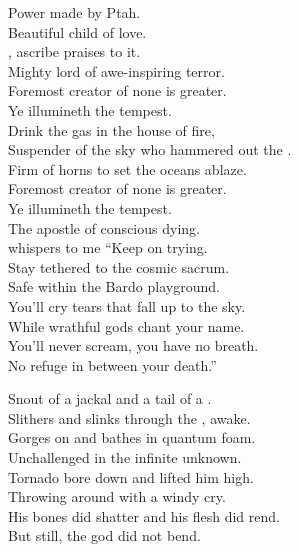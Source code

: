 
Power made by Ptah. \\
Beautiful child of love. \\
, ascribe praises to it. \\
Mighty lord of awe-inspiring terror. \\
Foremost creator of none is greater. \\
Ye illumineth the tempest. \\

Drink the gas in the house of fire, \\
Suspender of the sky who hammered out the . \\
Firm of horns to set the oceans ablaze. \\
Foremost creator of none is greater. \\
Ye illumineth the tempest. \\

The apostle of conscious dying. \\
whispers to me ``Keep on trying. \\
Stay tethered to the cosmic sacrum. \\
Safe within the Bardo playground. \\
You'll cry tears that fall up to the sky. \\
While wrathful gods chant your name. \\
You'll never scream, you have no breath. \\
No refuge in between your death.'' \\




Snout of a jackal and a tail of a . \\
Slithers and slinks through the , awake. \\
Gorges on  and bathes in quantum foam. \\
Unchallenged in the infinite unknown. \\

Tornado bore down and lifted him high. \\
Throwing  around with a windy cry. \\
His bones did shatter and his flesh did rend. \\
But still, the god did not bend. \\


